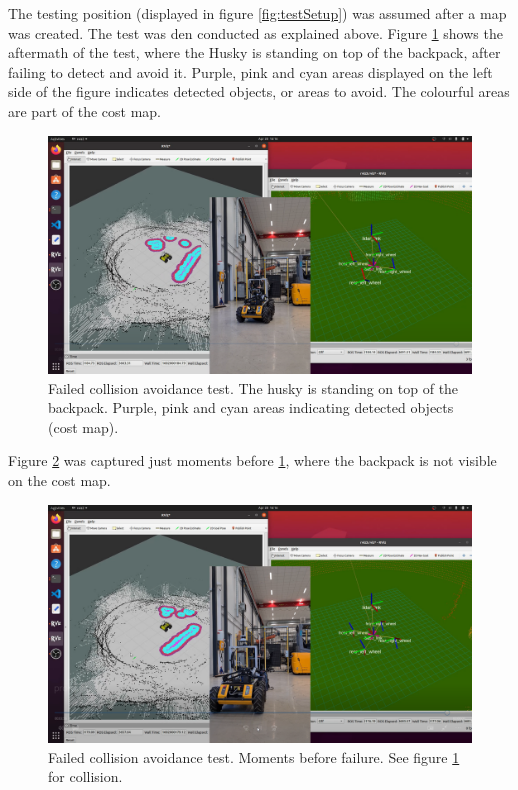 The testing position (displayed in figure \ref{fig:testSetup}) was assumed after a map was created. The test was den conducted as explained above. Figure \ref{fig:crashWithoutRadar} shows the aftermath of the test, where the Husky is standing on top of the backpack, after failing to detect and avoid it. Purple, pink and cyan areas displayed on the left side of the figure indicates detected objects, or areas to avoid. The colourful areas are part of the cost map.

\begin{figure}[H]
    \centering
    \includegraphics[width=\textwidth]{Figures/crashWithoutRadar.png}
    \caption{Failed collision avoidance test. The husky is standing on top of the backpack. Purple, pink and cyan areas indicating detected objects (cost map).}
    \label{fig:crashWithoutRadar}
\end{figure}

Figure \ref{fig:preCrashWithoutRadar} was captured just moments before \ref{fig:crashWithoutRadar}, where the backpack is not visible on the cost map. 

\begin{figure}[H]
    \centering
    \includegraphics[width=\textwidth]{Figures/preCrashWithoutRadar.png}
    \caption{Failed collision avoidance test. Moments before failure. See figure \ref{fig:crashWithoutRadar} for collision.}
    \label{fig:preCrashWithoutRadar}
\end{figure}

